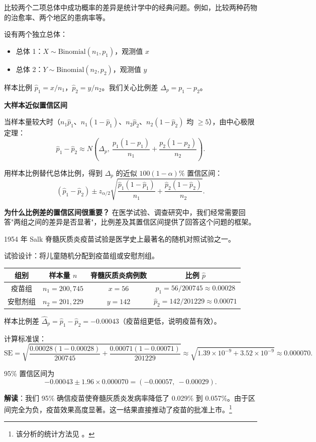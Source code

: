 比较两个二项总体中成功概率的差异是统计学中的经典问题。例如，比较两种药物的治愈率、两个地区的患病率等。

设有两个独立总体：
\begin{itemize}
\item 总体 1：$X \sim \mathrm{Binomial}(n_1, p_1)$，观测值 $x$
\item 总体 2：$Y \sim \mathrm{Binomial}(n_2, p_2)$，观测值 $y$
\end{itemize}

样本比例 $\widehat{p}_1 = x/n_1$，$\widehat{p}_2 = y/n_2$。我们关心比例差 $\Delta_p = p_1 - p_2$。

\textbf{大样本近似置信区间}

当样本量较大时（$n_1\widehat{p}_1$、$n_1(1-\widehat{p}_1)$、$n_2\widehat{p}_2$、$n_2(1-\widehat{p}_2)$ 均 $\geq 5$），由中心极限定理：
\[
\widehat{p}_1 - \widehat{p}_2 \approx N\!\left(\Delta_p,\ \frac{p_1(1-p_1)}{n_1} + \frac{p_2(1-p_2)}{n_2}\right).
\]

用样本比例替代总体比例，得到 $\Delta_p$ 的近似 $100(1-\alpha)\%$ 置信区间：
\[
\left(\widehat{p}_1 - \widehat{p}_2\right) \pm z_{\alpha/2}
\sqrt{\frac{\widehat{p}_1(1-\widehat{p}_1)}{n_1} + \frac{\widehat{p}_2(1-\widehat{p}_2)}{n_2}}.
\label{eq:two-proportion-ci}
\]

\textbf{为什么比例差的置信区间很重要？} 在医学试验、调查研究中，我们经常需要回答"两组之间的差异是否显著"，比例差及其置信区间提供了回答这个问题的框架。

\begin{example}[1954 年脊髓灰质炎疫苗试验]\label{ex:polio-vaccine}
1954 年 Salk 脊髓灰质炎疫苗试验是医学史上最著名的随机对照试验之一。

试验设计：将儿童随机分配到疫苗组或安慰剂组。
\begin{center}
\begin{tabular}{c|c|c|c}
\hline
组别 & 样本量 $n$ & 脊髓灰质炎病例数 & 比例 $\widehat{p}$ \\ \hline
疫苗组 & $n_1=200,745$ & $x=56$ & $\widehat{p}_1=56/200745\approx 0.00028$ \\
安慰剂组 & $n_2=201,229$ & $y=142$ & $\widehat{p}_2=142/201229\approx 0.00071$ \\ \hline
\end{tabular}
\end{center}

样本比例差 $\widehat{\Delta}_p = \widehat{p}_1 - \widehat{p}_2 = -0.00043$（疫苗组更低，说明疫苗有效）。

计算标准误：
\[
\mathrm{SE} = \sqrt{\frac{0.00028(1-0.00028)}{200745} + \frac{0.00071(1-0.00071)}{201229}}
\approx \sqrt{1.39\times10^{-9} + 3.52\times10^{-9}}
\approx 0.000070.
\]

95\% 置信区间为
\[
-0.00043 \pm 1.96 \times 0.000070 = (-0.00057,\ -0.00029).
\]

\textbf{解读}：我们 95\% 确信疫苗使脊髓灰质炎发病率降低了 0.029\% 到 0.057\%。由于区间完全为负，疫苗效果高度显著。这一结果直接推动了疫苗的批准上市。\footnote{该分析的统计方法见 \cite{Salk1955}。}
\end{example}

